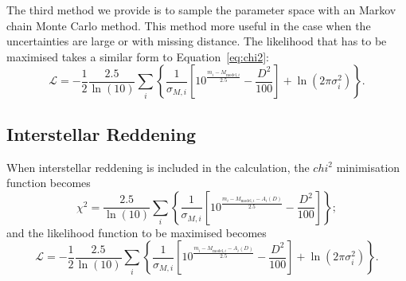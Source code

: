 \documentclass[fleqn,usenatbib]{rasti}
\begin{document}
The third method we provide is to sample the parameter space with an Markov chain
Monte Carlo method. This method more useful in the case when the uncertainties
are large or with missing distance. The likelihood that has to be maximised takes
a similar form to Equation~\ref{eq:chi2}:
\begin{equation}
    \label{eq:likelihood}
    \mathcal{L} = -\dfrac{1}{2} \dfrac{2.5}{\ln(10)} \sum_{i} \left\{ 
    \dfrac{1}{\sigma_{M, i}} \left[ 10^{\frac{m_{i} - M_{\mathrm{model}, i}}{2.5}}  - \dfrac{D^{2}}{100} \right]
    + \ln(2\pi\sigma_i^2) \right\}.
\end{equation}

\subsection{Interstellar Reddening}
When interstellar reddening is included in the calculation, the $chi^2$
minimisation function becomes
\begin{equation}
    \label{eq:chi2}
    \chi^{2} = \dfrac{2.5}{\ln(10)} \sum_{i}\left\{ \dfrac{1}{\sigma_{M, i}} \left[ 10^{\frac{m_{i} - M_{\mathrm{model}, i} - A_{i}(D)}{2.5}} - \dfrac{D^{2}}{100} \right] \right\};
\end{equation}
and the likelihood function to be maximised becomes
\begin{equation}
    \label{eq:likelihood}
    \mathcal{L} = -\dfrac{1}{2} \dfrac{2.5}{\ln(10)} \sum_{i} \left\{ 
    \dfrac{1}{\sigma_{M, i}} \left[ 10^{\frac{m_{i} - M_{\mathrm{model}, i} - A_{i}(D)}{2.5}}  - \dfrac{D^{2}}{100} \right]
    + \ln(2\pi\sigma_i^2) \right\}.
\end{equation}
\end{document}
